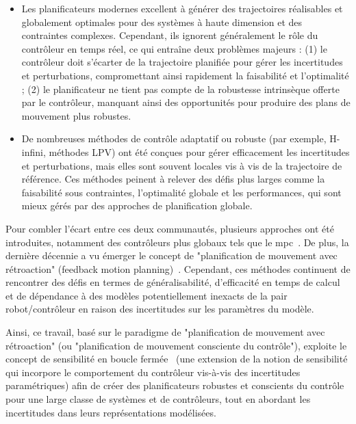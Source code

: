 \begin{itemize}
    \item Les planificateurs modernes excellent à générer des trajectoires réalisables et globalement optimales pour des systèmes à haute dimension et des contraintes complexes. 
    Cependant, ils ignorent généralement le rôle du contrôleur en temps réel, ce qui entraîne deux problèmes majeurs : (1) le contrôleur doit s’écarter de la trajectoire planifiée pour gérer les incertitudes et perturbations, compromettant ainsi rapidement la faisabilité et l’optimalité ; 
    (2) le planificateur ne tient pas compte de la robustesse intrinsèque offerte par le contrôleur, manquant ainsi des opportunités pour produire des plans de mouvement plus robustes.
    \item De nombreuses méthodes de contrôle adaptatif ou robuste (par exemple, H-infini, méthodes LPV) ont été conçues pour gérer efficacement les incertitudes et perturbations, mais elles sont souvent locales vis à vis de la trajectoire de référence. 
    Ces méthodes peinent à relever des défis plus larges comme la faisabilité sous contraintes, l’optimalité globale et les performances, qui sont mieux gérés par des approches de planification globale.
\end{itemize}
    
Pour combler l’écart entre ces deux communautés, plusieurs approches ont été introduites, notamment des contrôleurs plus globaux tels que le \gls{mpc}~\cite{cTMPC}. 
De plus, la dernière décennie a vu émerger le concept de "planification de mouvement avec rétroaction" (feedback motion planning)~\cite{cControlAwareAerialManip, cContractThMP, cContractThOnlineMP, cMajundarLibrary, cFaSTrack, cRandUpRRT, cRandUP}. 
Cependant, ces méthodes continuent de rencontrer des défis en termes de généralisabilité, d'efficacité en temps de calcul et de dépendance à des modèles potentiellement inexacts de la pair robot/contrôleur en raison des incertitudes sur les paramètres du modèle.

Ainsi, ce travail, basé sur le paradigme de "planification de mouvement avec rétroaction" (ou "planification de mouvement consciente du contrôle"), exploite le concept de sensibilité en boucle fermée~\cite{cPi,cTh} (une extension de la notion de sensibilité qui incorpore le comportement du contrôleur vis-à-vis des incertitudes paramétriques) afin de créer des planificateurs robustes et conscients du contrôle pour une large classe de systèmes et de contrôleurs, tout en abordant les incertitudes dans leurs représentations modélisées.

